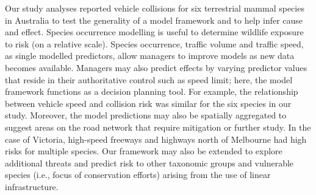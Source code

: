 Our study analyses reported vehicle collisions for six terrestrial mammal species in Australia to test the generality of a model framework and to help infer cause and effect. Species occurrence modelling is useful to determine wildlife exposure to risk (on a relative scale). Species occurrence, traffic volume and traffic speed, as single modelled predictors, allow managers to improve models as new data becomes available. Managers may also predict effects by varying predictor values that reside in their authoritative control such as speed limit; here, the model framework functions as a decision planning tool. For example, the relationship between vehicle speed and collision risk was similar for the six species in our study. Moreover, the model predictions may also be spatially aggregated to suggest areas on the road network that require mitigation or further study.  In the case of Victoria, high-speed freeways and highways north of Melbourne had high risks for multiple species. Our framework may also be extended to explore additional threats and predict risk to other taxonomic groups and vulnerable species (i.e., focus of conservation efforts) arising from the use of linear infrastructure.

